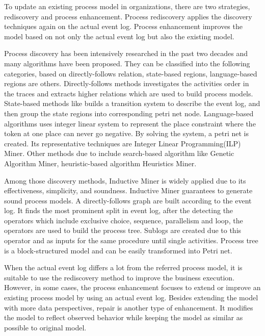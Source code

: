 To update an existing process model in organizations, there are two strategies, rediscovery and process enhancement. Process rediscovery applies the discovery techniques again on the actual event log. Process enhancement improves the model based on not only the actual event log but also the existing model. 

Process discovery has been intensively researched in the past two decades and many algorithms have been proposed. They can be classified into the following categories, based on directly-follows relation, state-based regions, language-based regions are others. Directly-follows\cite{van2004workflow, leemans2013discovering} methods investigates the activities order in the traces and extracts higher relations which are used to build process models. State-based methods like \cite{bergenthum2007process, cortadella1995synthesizing}  builds a transition system to describe the event log, and then group the state regions into corresponding petri net node. Language-based algorithms uses integer linear system to represent the place constraint where the token at one place can never go negative. By solving the system, a petri net is created. Its representative techniques are Integer Linear Programming(ILP) Miner\cite{van2008process}. Other methods due to \cite{van2009process} include search-based algorithm like Genetic Algorithm Miner\cite{de2007genetic}, heuristic-based algorithm Heuristics Miner\cite{weijters2003rediscovering}.

Among those discovery methods, Inductive Miner is widely applied due to its effectiveness, simplicity, and soundness. Inductive Miner \cite{leemans2013discovering} guarantees to generate sound process models. A directly-follows graph are built according to the event log. It finds the most prominent split in event log, after the detecting the operators which include exclusive choice, sequence, parallelism and loop, the operators are used to build the process tree. Sublogs are created due to this operator and as inputs for the same procedure until single activities. Process tree is a block-structured model and can be easily transformed into Petri net.  
 
When the actual event log differs a lot from the referred process model, it is suitable to use the rediscovery method to improve the business execution. However, in some cases, the process enhancement focuses to extend or improve an existing process model by using an actual event log\cite{van2011process}. Besides extending the model with more data perspectives, repair is another type of enhancement. It modifies the model to reflect observed behavior while keeping the model as similar as possible to original model.

